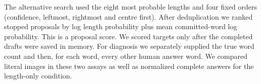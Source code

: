 The alternative search used the eight most probable lengths and four fixed orders (confidence, leftmost, rightmost and centre first). After deduplication we ranked stopped proposals by log length probability plus mean committed-word log probability. This is a proposal score. We scored targets only after the completed drafts were saved in memory. For diagnosis we separately supplied the true word count and then, for each word, every other human answer word. We compared literal images in these two assays as well as normalized complete answers for the length-only condition.
